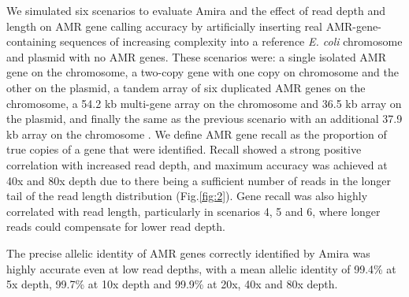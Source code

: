 We simulated six scenarios to evaluate Amira and the effect of read depth and length on AMR gene calling accuracy by artificially inserting real AMR-gene-containing sequences of increasing complexity into a reference \textit{E. coli} chromosome and plasmid with no AMR genes. These scenarios were: a single isolated AMR gene on the chromosome, a two-copy gene with one copy on chromosome and the other on the plasmid, a tandem array of six duplicated AMR genes on the chromosome, a 54.2 kb multi-gene array on the chromosome and 36.5 kb array on the plasmid, and finally the same as the previous scenario with an additional 37.9 kb array on the chromosome \cite{TamamuraAndoh2021}. We define AMR gene recall as the proportion of true copies of a gene that were identified. Recall showed a strong positive correlation with increased read depth, and maximum accuracy was achieved at 40x and 80x depth due to there being a sufficient number of reads in the longer tail of the read length distribution (Fig.\ref{fig:2}). Gene recall was also highly correlated with read length, particularly in scenarios 4, 5 and 6, where longer reads could compensate for lower read depth.

The precise allelic identity of AMR genes correctly identified by Amira was highly accurate even at low read depths, with a mean allelic identity of 99.4\% at 5x depth, 99.7\% at 10x depth and 99.9\% at 20x, 40x and 80x depth.

